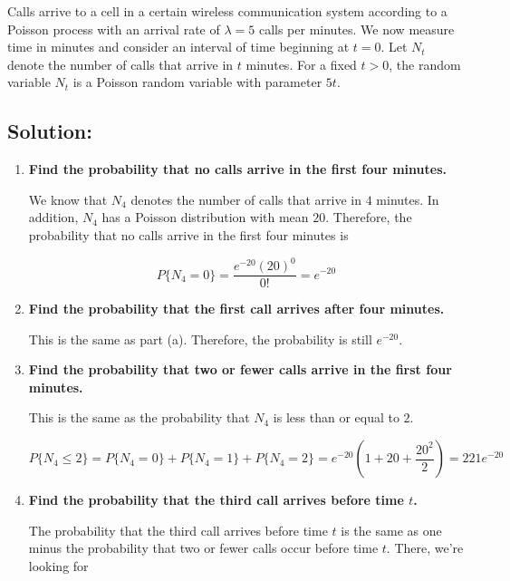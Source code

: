 \documentclass{article}
\begin{document}
Calls arrive to a cell in a certain wireless communication system according to a Poisson process with an arrival rate of $\lambda = 5$ calls per minutes. We now measure time in minutes and consider an interval of time beginning at $t = 0$. Let $N_t$ denote the number of calls that arrive in $t$ minutes. For a fixed $t > 0$, the random variable $N_t$ is a Poisson random variable with parameter $5t$.

\subsection{Solution:}

\begin{enumerate}[label=(\alph*)]
    \item \textbf{Find the probability that no calls arrive in the first four minutes.}

    We know that $N_4$ denotes the number of calls that arrive in $4$ minutes. In addition, $N_4$ has a Poisson distribution with mean $20$. Therefore, the probability that no calls arrive in the first four minutes is

    $$P\{N_4 = 0\} = \frac{e^{-20}(20)^0}{0!} = \boxed{e^{-20}}$$

    \vspace{2cm}
    
    \item \textbf{Find the probability that the first call arrives after four minutes.}

    This is the same as part (a). Therefore, the probability is still $\boxed{e^{-20}}$.

    \vspace{2cm}
    
    \item \textbf{Find the probability that two or fewer calls arrive in the first four minutes.}

    This is the same as the probability that $N_4$ is less than or equal to $2$.

    $$P\{N_4 \leq 2\} = P\{N_4 = 0\} + P\{N_4 = 1\} + P\{N_4 = 2\} = e^{-20}\left(1 + 20 + \frac{20^2}{2}\right) = \boxed{221e^{-20}}$$

    \vspace{2cm}
    
    \item \textbf{Find the probability that the third call arrives before time $t$.}

    The probability that the third call arrives before time $t$ is the same as one minus the probability that two or fewer calls occur before time $t$. There, we're looking for 


\end{enumerate}
\end{document}
